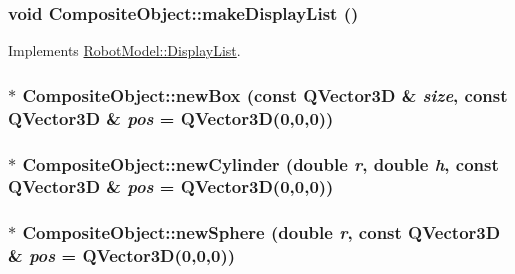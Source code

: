\label{class_robot_model_1_1_composite_object_ad02b7a8e84453fb433d5efaac80333c9}
\hypertarget{class_robot_model_1_1_composite_object_a5aa475cb09f0e9b9089a941848f9e189}{
\subsubsection[{makeDisplayList}]{\setlength{\rightskip}{0pt plus 5cm}void CompositeObject::makeDisplayList ()}}
\label{class_robot_model_1_1_composite_object_a5aa475cb09f0e9b9089a941848f9e189}


Implements \hyperlink{class_robot_model_1_1_display_list_a842de97924298c7363e50aebd69e5a50}{RobotModel::DisplayList}.\hypertarget{class_robot_model_1_1_composite_object_a869235cebecc6802b9c63ce7e2359ddb}{
\subsubsection[{newBox}]{ $\ast$ CompositeObject::newBox (const QVector3D \& {\em size}, \/  const QVector3D \& {\em pos} = {\ttfamily QVector3D(0,0,0)})}}
\label{class_robot_model_1_1_composite_object_a869235cebecc6802b9c63ce7e2359ddb}
\hypertarget{class_robot_model_1_1_composite_object_a196a2811a85c1313f781b140f2ab313e}{
\subsubsection[{newCylinder}]{ $\ast$ CompositeObject::newCylinder (double {\em r}, \/  double {\em h}, \/  const QVector3D \& {\em pos} = {\ttfamily QVector3D(0,0,0)})}}
\label{class_robot_model_1_1_composite_object_a196a2811a85c1313f781b140f2ab313e}
\hypertarget{class_robot_model_1_1_composite_object_aa5b61818415089630ee37a3767b5c37c}{
\subsubsection[{newSphere}]{ $\ast$ CompositeObject::newSphere (double {\em r}, \/  const QVector3D \& {\em pos} = {\ttfamily QVector3D(0,0,0)})}}
